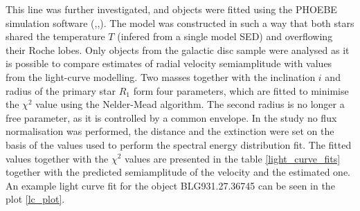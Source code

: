 \documentclass{pracalicmgr}
\begin{document}
This line was further investigated, and objects were fitted using the
PHOEBE simulation software (\citet*{wilson_realization_1971},\citet*{prsa_computational_2005},\citet*{conroy_physics_2020}).
The model was constructed in such a way that both stars shared the temperature $T$ (infered from a single model SED) and overflowing their Roche lobes.
Only objects from the galactic disc sample were analysed as it is possible to compare estimates of radial velocity semiamplitude with
values from the light-curve modelling.
Two masses together with the inclination $i$ and radius of the primary star $R_1$ form four parameters, which are fitted to minimise the $\chi^2$ value using the Nelder-Mead algorithm.
The second radius is no longer a free parameter, as it is controlled by a common envelope.
In the study no flux normalisation was performed, the distance and the extinction were set on the basis of the values used to perform the spectral energy distribution fit.
The fitted values together with the $\chi^2$ values are presented in the table \ref{light_curve_fits}
together with the predicted semiamplitude of the velocity and the estimated one.
An example light curve fit for the object BLG931.27.36745 can be seen in the plot \ref{lc_plot}.
\end{document}
